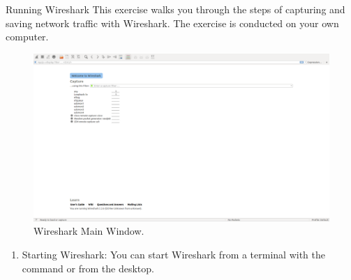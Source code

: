 \begin{exercise}{Running Wireshark}
This exercise walks you through the steps of capturing and saving network traffic with Wireshark. The exercise is conducted on your own computer.

\begin{figure}[ht]
	\centering
	\includegraphics[width=\linewidth]{graphics/wireshark-main}	
	\caption{Wireshark Main Window.}
	\label{fig:lab1-wireshark-main}
\end{figure}

\begin{enumerate}
	\item Starting Wireshark: You can start Wireshark from a terminal with the command  or from the desktop.
	

\end{enumerate}
\end{exercise}
